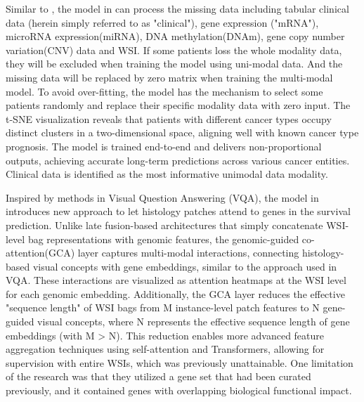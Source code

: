 \documentclass[journal,twoside,web]{ieeecolor}
\begin{document}
Similar to \cite{cheerla2019deep}, the model in \cite{vale2021long} can process the missing data including tabular clinical data (herein simply referred to as "clinical"), gene expression ("mRNA"), microRNA expression(miRNA), DNA methylation(DNAm), gene copy number variation(CNV) data and WSI.
If some patients loss the whole modality data, they will be excluded when training the model using uni-modal data.
And the missing data will be replaced by zero matrix when training the multi-modal model.
To avoid over-fitting, the model has the mechanism to select some patients randomly and replace their specific modality data with zero input.
The t-SNE visualization reveals that patients with different cancer types occupy distinct clusters in a two-dimensional space, aligning well with known cancer type prognosis.
The model is trained end-to-end and delivers non-proportional outputs, achieving accurate long-term predictions across various cancer entities. 
Clinical data is identified as the most informative unimodal data modality.

Inspired by methods in Visual Question Answering (VQA), the model in \cite{chen2021multimodal} introduces new approach to let histology patches attend to genes in the survival prediction.
Unlike late fusion-based architectures that simply concatenate WSI-level bag representations with genomic features, the genomic-guided co-attention(GCA) layer captures multi-modal interactions, connecting histology-based visual concepts with gene embeddings, similar to the approach used in VQA.  
These interactions are visualized as attention heatmaps at the WSI level for each genomic embedding.
Additionally, the GCA layer reduces the effective "sequence length" of WSI bags from M instance-level patch features to N gene-guided visual concepts, where N represents the effective sequence length of gene embeddings (with M > N). 
This reduction enables more advanced feature aggregation techniques using self-attention and Transformers, allowing for supervision with entire WSIs, which was previously unattainable.
One limitation of the research was that they utilized a gene set that had been curated previously, and it contained genes with overlapping biological functional impact.
\end{document}
